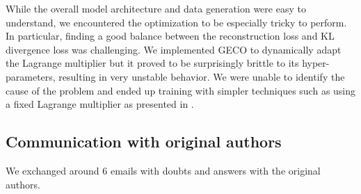 \documentclass{article}
\begin{document}
While the overall model architecture and data generation were easy to understand, we encountered the optimization to be especially tricky to perform.
In particular, finding a good balance between the reconstruction loss and KL divergence loss was challenging.
We implemented GECO \cite{geco} to dynamically adapt the Lagrange multiplier but it proved to be surprisingly brittle to its hyper-parameters, resulting in very unstable behavior.
We were unable to identify the cause of the problem and ended up training with simpler techniques such as using a fixed Lagrange multiplier as presented in \cite{beta-vae}.

\subsection*{Communication with original authors}

We exchanged around 6 emails with doubts and answers with the original authors.


\newpage














\small

\end{document}
